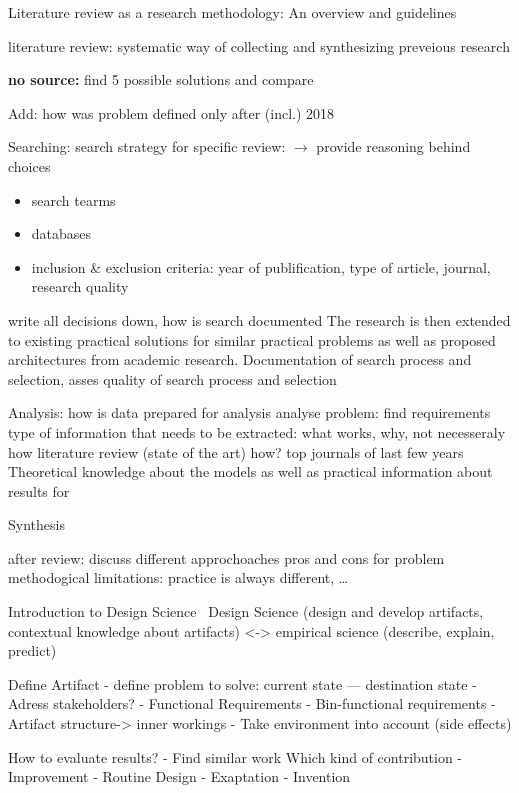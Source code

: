Literature review as a research methodology: An overview and guidelines~\cite{snyder_literature_2019}
\begin{itemize}
    literature review: systematic way of collecting and synthesizing preveious research
\end{itemize}

\textbf{no source:}
find 5 possible solutions and compare

Add: how was problem defined
only after (incl.) 2018

Searching:
search strategy for specific review: $\rightarrow$ provide reasoning behind choices
\begin{itemize}
    \item search tearms
    \item databases
    \item inclusion \& exclusion criteria: year of publification, type of article, journal, research
        quality
\end{itemize}
write all decisions down, how is search documented
The research is then extended to existing practical solutions for similar practical problems as
well as proposed architectures from academic research.
Documentation of search process and selection, asses quality of search process and selection

Analysis:
how is data prepared for analysis
analyse problem: find requirements
type of information that needs to be extracted: what works, why, not necesseraly how
literature review (state of the art)
how? top journals of last few years
Theoretical knowledge about the models as well as practical information about results for

Synthesis

after review:
discuss different approchoaches pros and cons for problem
methodogical limitations: practice is always different, \ldots


Introduction to Design Science~\citep{johannesson_introduction_2021}
Design Science (design and develop artifacts, contextual knowledge about artifacts) <-> empirical science (describe, explain, predict)

Define Artifact
- define problem to solve: current state --- destination  state
- Adress stakeholders?
- Functional Requirements
- Bin-functional requirements
- Artifact structure-> inner workings
- Take environment into account (side effects)

How to evaluate results?
- Find similar work
Which kind of contribution
- Improvement
- Routine Design
- Exaptation
- Invention

